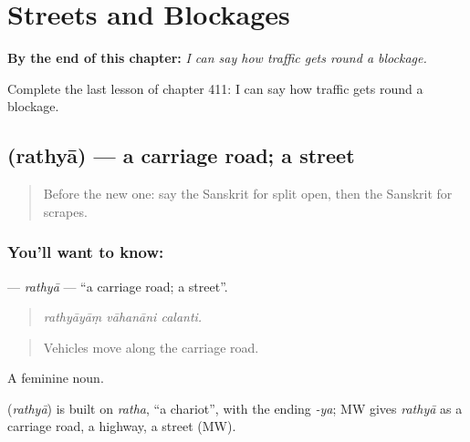 
\chapter{Streets and Blockages}
\label{ch:sa-streets-and-blockages}

\begin{chapteropening}
\textbf{By the end of this chapter:} \emph{I can say how traffic gets round a blockage.}

Complete the last lesson of chapter 411: I can say how traffic gets round a blockage.
\end{chapteropening}

\section[\texorpdfstring{\sk{रथ्या} (rathyā)}{रथ्या (rathyā)}]{ (rathyā) — a carriage road; a street}

\label{lesson:SA-C411-rathya}



\begin{quote}
Before the new one: say the Sanskrit for split open, then the Sanskrit for scrapes.
\end{quote}

\subsection*{You'll want to know: }
\textbf{} — \emph{rathyā} — \textquotedblleft{}a carriage road; a street\textquotedblright{}.

\begin{quote}
  
\end{quote}

\begin{quote}
\emph{rathyāyāṃ vāhanāni calanti.}
\end{quote}

\begin{quote}
Vehicles move along the carriage road.
\end{quote}

A feminine noun.

\begin{cousinweb}
\textbf{} (\emph{rathyā}) is built on \emph{ratha}, \textquotedblleft{}a chariot\textquotedblright{}, with the ending \emph{-ya}; MW gives \emph{rathyā} as a carriage road, a highway, a street (MW).
\end{cousinweb}

